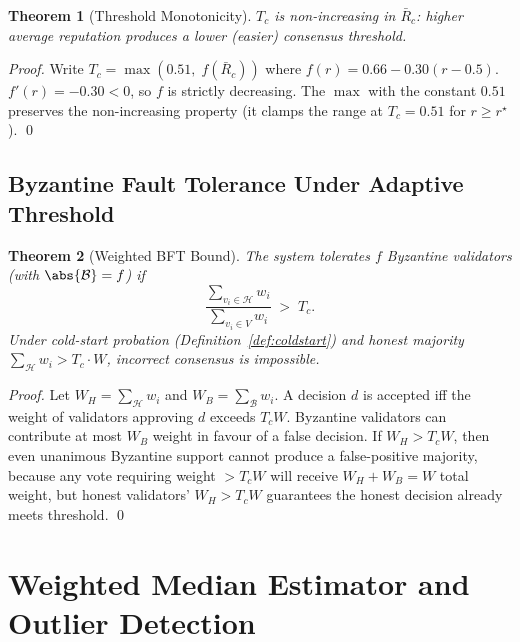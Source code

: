 \documentclass[12pt,a4paper]{article}
\newtheorem{theorem}{Theorem}[section]
\theoremstyle{definition}
\theoremstyle{remark}
\begin{document}
\begin{theorem}[Threshold Monotonicity]
\label{thm:mono}
$T_c$ is non-increasing in $\bar{R}_c$: higher average reputation produces a lower
(easier) consensus threshold.
\end{theorem}

\begin{proof}
Write $T_c = \max(0.51,\; f(\bar{R}_c))$ where
$f(r) = 0.66 - 0.30(r-0.5)$.
$f'(r) = -0.30 < 0$, so $f$ is strictly decreasing.
The $\max$ with the constant $0.51$ preserves the non-increasing property
(it clamps the range at $T_c=0.51$ for $r \ge r^\star$). \qed
\end{proof}

\subsection{Byzantine Fault Tolerance Under Adaptive Threshold}

\begin{theorem}[Weighted BFT Bound]
\label{thm:bft}
The system tolerates $f$ Byzantine validators (with $\abs{\mathcal{B}}=f$) if
\begin{equation}
  \frac{\sum_{v_i\in\mathcal{H}} w_i}{\sum_{v_i\in V} w_i}
  \;>\; T_c.
  \label{eq:bft}
\end{equation}
Under cold-start probation (Definition~\ref{def:coldstart}) and honest majority
$\sum_{\mathcal{H}} w_i > T_c \cdot W$, incorrect consensus is impossible.
\end{theorem}

\begin{proof}
Let $W_H = \sum_{\mathcal{H}}w_i$ and $W_B=\sum_{\mathcal{B}}w_i$.
A decision $d$ is accepted iff the weight of validators approving $d$ exceeds $T_c W$.
Byzantine validators can contribute at most $W_B$ weight in favour of a false
decision.  If $W_H > T_c W$, then even unanimous Byzantine support cannot produce a
false-positive majority, because any vote requiring weight $> T_c W$ will receive
$W_H + W_B = W$ total weight, but honest validators' $W_H > T_c W$ guarantees the
honest decision already meets threshold.  \qed
\end{proof}

\section{Weighted Median Estimator and Outlier Detection}
\label{sec:wmed}
\end{document}
